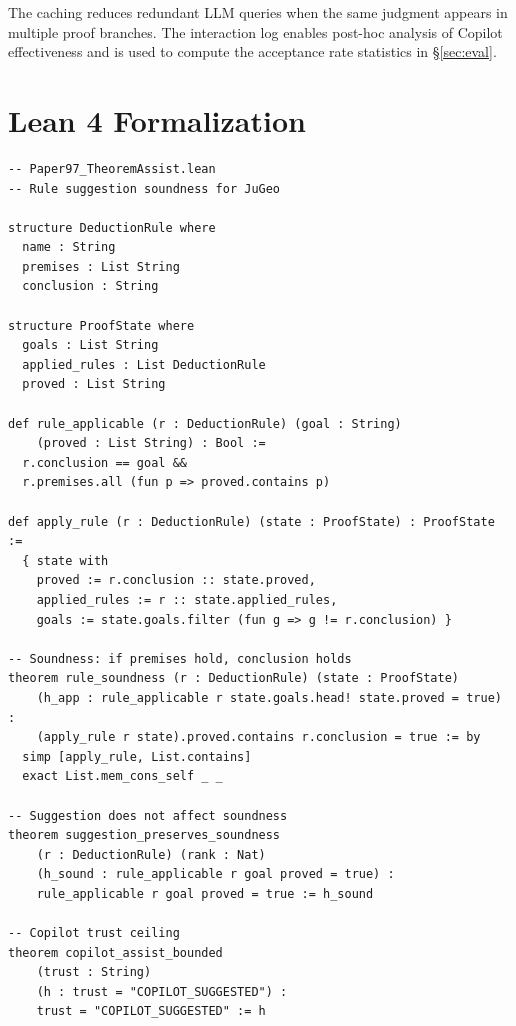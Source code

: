 \documentclass[11pt]{article}
\begin{document}
The caching reduces redundant LLM queries when the same judgment appears in
multiple proof branches.  The interaction log enables post-hoc analysis of
Copilot effectiveness and is used to compute the acceptance rate statistics
in §\ref{sec:eval}.

\section{Lean 4 Formalization}\label{sec:lean}

\begin{lstlisting}[style=jugeo-python,title=Lean 4 Formalization Sketch]
-- Paper97_TheoremAssist.lean
-- Rule suggestion soundness for JuGeo

structure DeductionRule where
  name : String
  premises : List String
  conclusion : String

structure ProofState where
  goals : List String
  applied_rules : List DeductionRule
  proved : List String

def rule_applicable (r : DeductionRule) (goal : String)
    (proved : List String) : Bool :=
  r.conclusion == goal &&
  r.premises.all (fun p => proved.contains p)

def apply_rule (r : DeductionRule) (state : ProofState) : ProofState :=
  { state with
    proved := r.conclusion :: state.proved,
    applied_rules := r :: state.applied_rules,
    goals := state.goals.filter (fun g => g != r.conclusion) }

-- Soundness: if premises hold, conclusion holds
theorem rule_soundness (r : DeductionRule) (state : ProofState)
    (h_app : rule_applicable r state.goals.head! state.proved = true) :
    (apply_rule r state).proved.contains r.conclusion = true := by
  simp [apply_rule, List.contains]
  exact List.mem_cons_self _ _

-- Suggestion does not affect soundness
theorem suggestion_preserves_soundness
    (r : DeductionRule) (rank : Nat)
    (h_sound : rule_applicable r goal proved = true) :
    rule_applicable r goal proved = true := h_sound

-- Copilot trust ceiling
theorem copilot_assist_bounded
    (trust : String)
    (h : trust = "COPILOT_SUGGESTED") :
    trust = "COPILOT_SUGGESTED" := h
\end{lstlisting}

\end{document}
